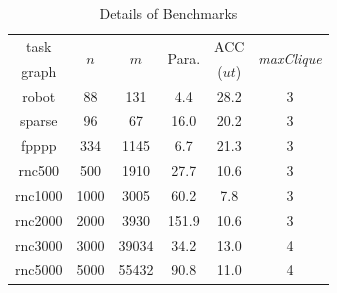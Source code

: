 \documentclass[10pt,journal, compsoc]{IEEEtran}
\begin{document}
\begin{table}[!h]
\renewcommand{\arraystretch}{1.1}
\caption{Details of Benchmarks}
\centering
\begin{tabular}{c|c|c|c|c|c}
\hline
\hline

task    &\multicolumn{1}{c|}{\multirow{2}{*}{$n$}}     &\multicolumn{1}{c|}{\multirow{2}{*}{$m$}}     &\multicolumn{1}{c|}{\multirow{2}{*}{Para. }}  &ACC   &\multicolumn{1}{c}{\multirow{2}{*}{\textit{maxClique}}}  \\
graph   &                                            &           &        & ($ut$)          &       \\
\hline
\hline

robot   &88   &131     &4.4 &28.2   &3 \\

sparse  &96   &67    &16.0  &20.2   &3 \\

fpppp   &334   &1145    &6.7  &21.3    &3  \\

rnc500  &500   &1910    &27.7  &10.6    &3  \\

rnc1000  &1000   &3005   &60.2  &7.8  &3 \\

rnc2000   &2000   &3930   &151.9  &10.6  &3 \\

rnc3000   &3000   &39034    &34.2 &13.0   &4  \\

rnc5000   &5000   &55432   &90.8  &11.0  &4 \\

\hline
\hline
\end{tabular}
\label{table:detail}
\end{table}
\end{document}
